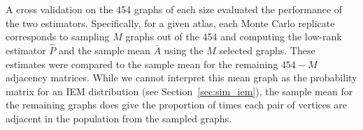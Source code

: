 \documentclass[journal,twoside,web]{ieeecolor}
\begin{document}



A cross validation on the 454 graphs of each size evaluated the performance of the two estimators.
Specifically, for a given atlas, each Monte Carlo replicate corresponds to sampling $M$ graphs out of the 454 and computing the low-rank estimator $\hat{P}$ and the sample mean $\bar{A}$ using the $M$ selected graphs.
These estimates were compared to the sample mean for the remaining $454-M$ adjacency matrices.
While we cannot interpret this mean graph as the probability matrix for an IEM distribution (see Section~\ref{sec:sim_iem}), the sample mean for the remaining graphs does give the proportion of times each pair of vertices are adjacent in the population from  the sampled graphs.

\end{document}
